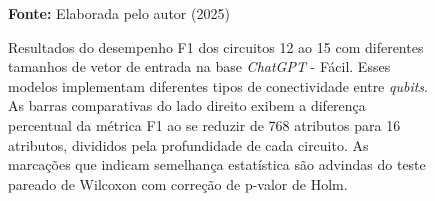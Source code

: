 \begin{figure}
\caption{Resultados do desempenho F1 dos circuitos 12 ao 15 com diferentes tamanhos de vetor de entrada na base \textit{ChatGPT} - Fácil. Esses modelos implementam diferentes tipos de conectividade entre \textit{qubits}. As barras comparativas do lado direito exibem a diferença percentual da métrica F1 ao se reduzir de 768 atributos para 16 atributos, divididos pela profundidade de cada circuito. As marcações que indicam semelhança estatística são advindas do teste pareado de Wilcoxon com correção de p-valor de Holm.}
\label{fig:n_features:easy:g3}
     \centering
    \centering
      \par\medskip\ABNTEXfontereduzida\selectfont\textbf{Fonte:} Elaborada pelo autor (2025) \par\medskip
\end{figure}